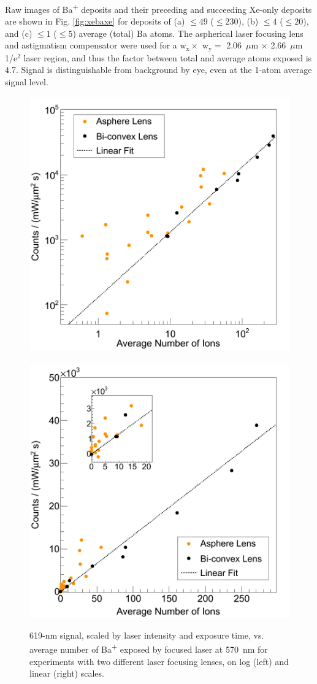 
Raw images of Ba\textsuperscript{+} deposits and their preceding and succeeding Xe-only deposits are shown in Fig. \ref{fig:xebaxe} for deposits of (a) $\leq 49$ ($\leq 230$), (b) $\leq 4$ ($\leq 20$), and (c) $\leq 1$ ($\leq 5$) average (total) Ba atoms.  The aspherical laser focusing lens and astigmatism compensator were used for a w$_{\text{x}} \times$ w$_{\text{y}} =$ 2.06~$\mu$m $\times$ 2.66~$\mu$m 1/e$^{2}$ laser region, and thus the factor between total and average atoms exposed is 4.7.  Signal is distinguishable from background by eye, even at the 1-atom average signal level.


\begin{figure} %
        \centering
                \includegraphics[width=.5\textwidth]{figures/lin_20150526and20150807_log.png}
                ~
                \includegraphics[width=.5\textwidth]{figures/lin_20150526and20150807_lin.png}
                \caption{619-nm signal, scaled by laser intensity and exposure time, vs. average number of Ba\textsuperscript{+} exposed by focused laser at 570~nm for experiments with two different laser focusing lenses, on log (left) and linear (right) scales.} %
\label{fig:lin}
\end{figure}

